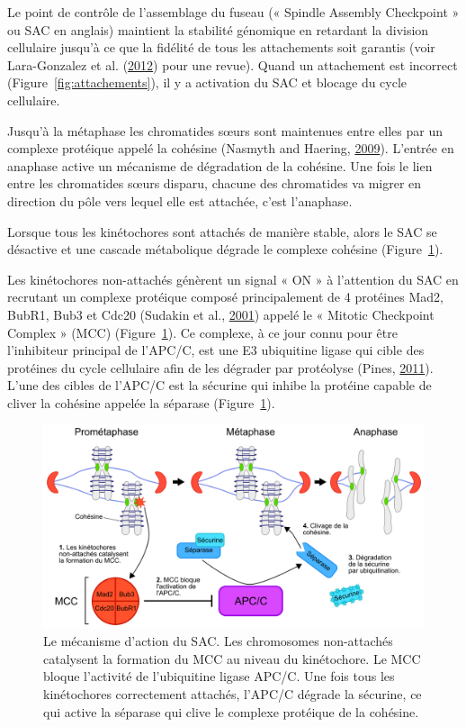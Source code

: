 \documentclass[12pt,a4paper,twoside,openright]{book}
\begin{document}
Le point de contrôle de l'assemblage du fuseau (« Spindle Assembly
Checkpoint » ou SAC en anglais) maintient la stabilité génomique en
retardant la division cellulaire jusqu'à ce que la fidélité de tous les
attachements soit garantis (voir Lara-Gonzalez et al.
(\hyperref[ref-Lara-Gonzalez2012]{2012}) pour une revue). Quand un
attachement est incorrect (Figure~\ref{fig:attachements}), il y a
activation du SAC et blocage du cycle cellulaire.

Jusqu'à la métaphase les chromatides sœurs sont maintenues entre elles
par un complexe protéique appelé la cohésine (Nasmyth and Haering,
\hyperref[ref-Nasmyth2009]{2009}). L'entrée en anaphase active un
mécanisme de dégradation de la cohésine. Une fois le lien entre les
chromatides sœurs disparu, chacune des chromatides va migrer en
direction du pôle vers lequel elle est attachée, c'est l'anaphase.

Lorsque tous les kinétochores sont attachés de manière stable, alors le
SAC se désactive et une cascade métabolique dégrade le complexe cohésine
(Figure~\ref{fig:sac}).

Les kinétochores non-attachés génèrent un signal « ON » à l'attention du
SAC en recrutant un complexe protéique composé principalement de 4
protéines Mad2, BubR1, Bub3 et Cdc20 (Sudakin et al.,
\hyperref[ref-Sudakin2001]{2001}) appelé le « Mitotic Checkpoint Complex
» (MCC) (Figure~\ref{fig:sac}). Ce complexe, à ce jour connu pour être
l'inhibiteur principal de l'APC/C, est une E3 ubiquitine ligase qui
cible des protéines du cycle cellulaire afin de les dégrader par
protéolyse (Pines, \hyperref[ref-Pines2011]{2011}). L'une des cibles de
l'APC/C est la sécurine qui inhibe la protéine capable de cliver la
cohésine appelée la séparase (Figure~\ref{fig:sac}).

\begin{figure}[htbp]
\centering
\includegraphics{figures/intro/sac.png}
\caption[Le mécanisme d'action du SAC]{\label{fig:sac}Le mécanisme
d'action du SAC. Les chromosomes non-attachés catalysent la formation du
MCC au niveau du kinétochore. Le MCC bloque l'activité de l'ubiquitine
ligase APC/C. Une fois tous les kinétochores correctement attachés,
l'APC/C dégrade la sécurine, ce qui active la séparase qui clive le
complexe protéique de la cohésine.}
\end{figure}
\end{document}
